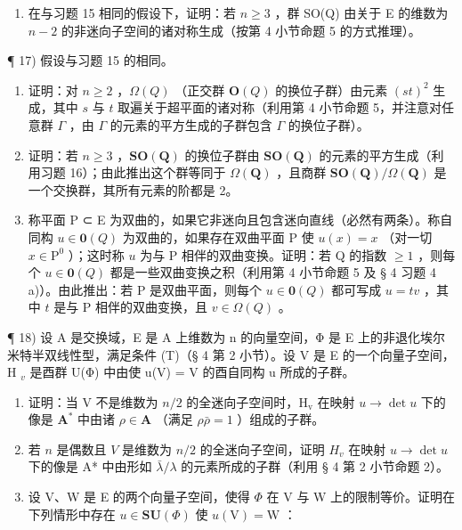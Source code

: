 \begin{enumerate}
\def\labelenumi{\arabic{enumi})}
\setcounter{enumi}{15}
\tightlist
\item
  在与习题 15 相同的假设下，证明：若 \(n \geqslant 3\) ，群 SO(Q) 由关于 E 的维数为 \(n - 2\) 的非迷向子空间的诸对称生成（按第 4 小节命题 5 的方式推理）。
\end{enumerate}

¶ 17) 假设与习题 15 的相同。

\begin{enumerate}
\def\labelenumi{\alph{enumi})}
\item
  证明：对 \(n \geqslant 2\) ，\(\Omega(Q)\) （正交群 \(\mathbf{O}(Q)\) 的换位子群）由元素 \((st)^{2}\) 生成，其中 \(s\) 与 \(t\) 取遍关于超平面的诸对称（利用第 4 小节命题 5，并注意对任意群 \(\Gamma\) ，由 \(\Gamma\) 的元素的平方生成的子群包含 \(\Gamma\) 的换位子群）。
\item
  证明：若 \(n \geqslant 3\) ，\(\mathbf{SO}(\mathbf{Q})\) 的换位子群由 \(\mathbf{SO}(\mathbf{Q})\) 的元素的平方生成（利用习题 16）；由此推出这个群等同于 \(\Omega(\mathbf{Q})\) ，且商群 \(\mathbf{SO}(\mathbf{Q})/\Omega(\mathbf{Q})\) 是一个交换群，其所有元素的阶都是 2。
\item
  称平面 P ⊂ E 为双曲的，如果它非迷向且包含迷向直线（必然有两条）。称自同构 \(u \in \mathbf{0}(Q)\) 为双曲的，如果存在双曲平面 P 使 \(u(x) = x\) （对一切 \(x \in \mathrm{P}^0\) ）；这时称 \(u\) 为与 P 相伴的双曲变换。证明：若 Q 的指数 \(\geqslant 1\) ，则每个 \(u \in \mathbf{0}(Q)\) 都是一些双曲变换之积（利用第 4 小节命题 5 及 § 4 习题 4 a)）。由此推出：若 P 是双曲平面，则每个 \(u \in \mathbf{0}(Q)\) 都可写成 \(u = tv\) ，其中 \(t\) 是与 P 相伴的双曲变换，且 \(v \in \Omega(Q)\) 。
\end{enumerate}

¶ 18) 设 A 是交换域，E 是 A 上维数为 n 的向量空间，Φ 是 E 上的非退化埃尔米特半双线性型，满足条件 (T)（§ 4 第 2 小节）。设 V 是 E 的一个向量子空间，H \(_{v}\) 是酉群 U(Φ) 中由使 u(V) = V 的酉自同构 u 所成的子群。

\begin{enumerate}
\def\labelenumi{\alph{enumi})}
\item
  证明：当 V 不是维数为 \(n/2\) 的全迷向子空间时，\(\mathrm{H}_{\mathrm{v}}\) 在映射 \(u \to \det u\) 下的像是 \(\mathbf{A}^*\) 中由诸 \(\rho \in \mathbf{A}\) （满足 \(\rho \bar{\rho} = 1\) ）组成的子群。
\item
  若 \(n\) 是偶数且 \(V\) 是维数为 \(n/2\) 的全迷向子空间，证明 \(H_{v}\) 在映射 \(u \rightarrow \det u\) 下的像是 A* 中由形如 \(\bar{\lambda}/\lambda\) 的元素所成的子群（利用 § 4 第 2 小节命题 2）。
\item
  设 V、W 是 E 的两个向量子空间，使得 \(\Phi\) 在 V 与 W 上的限制等价。证明在下列情形中存在 \(u \in \mathbf{S}\mathbf{U}(\Phi)\) 使 \(u(\mathrm{V}) = \mathrm{W}\) ：
\end{enumerate}


